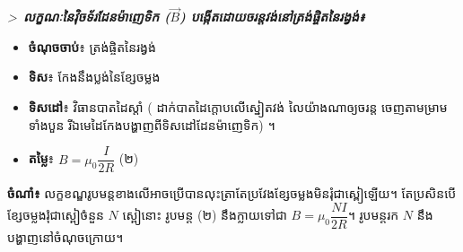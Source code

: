 \vspace{1em}
\noindent
\begin{minipage}[t]{0.55\textwidth}
	\raggedright
	\textit{\textgreater\
	\textbf{លក្ខណៈនៃវ៉ិចទ័រដែនម៉ាញេទិក ($\vec{B}$) បង្កើតដោយចរន្តវង់នៅត្រង់ផ្ចិតនៃរង្វង់៖}}

	\vspace{0.5em}
	\begin{itemize}[itemsep=4pt, topsep=2pt, parsep=0pt, leftmargin=1.6em]
	\item \textbf{ចំណុចចាប់}៖ ត្រង់ផ្ចិតនៃរង្វង់
	\item \textbf{ទិស}៖ កែងនឹងប្លង់នៃខ្សែចម្លង
	\item \textbf{ទិសដៅ}៖ វិធានបាតដៃស្តាំ (
	ដាក់បាតដៃក្តោបលើស្នៀតវង់ លៃយ៉ាងណាឲ្យចរន្ត ចេញតាមម្រាមទាំងបួន រីឯមេដៃកែងបង្ហាញពីទិសដៅដែនម៉ាញេទិក) ។
	\item \textbf{តម្លៃ}៖ $B = \mu_0 \dfrac{I}{2R}$ \quad (២)
	\end{itemize}
	\vspace{0.5em}
\end{minipage}%
\hfill
\begin{minipage}[t]{0.40\textwidth}
	\vspace{0pt}
	\hspace*{0.5em}%
\end{minipage}
\begin{center}
	\textbf{ចំណាំ៖  }
	លក្ខខណ្ឌរូបមន្តខាងលើអាចប្រើបានលុះត្រាតែប្រវែងខ្សែចម្លងមិនរុំជាស្ពៀឡើយ។
	តែប្រសិនបើខ្សែចម្លងរុំជាស្ពៀចំនួន $N$
	ស្ពៀនោះ រូបមន្ត (២) នឹងក្លាយទៅជា
	$\boxed{B = \mu_0 \dfrac{NI}{2R}}$។ រូបមន្តរក $N$ នឹងបង្ហាញនៅចំណុចក្រោយ។
\end{center}


